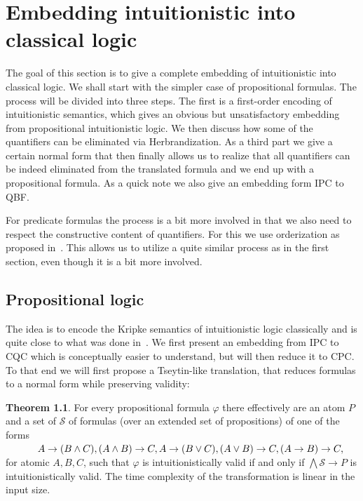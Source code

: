 \documentclass[a4paper,11pt]{report}
\theoremstyle{definition}
\newtheorem{theorem}{Theorem}[section]
\theoremstyle{definition}
\theoremstyle{definition}
\theoremstyle{definition}
\theoremstyle{definition}
\theoremstyle{definition}
\theoremstyle{definition}
\begin{document}
	
	

	\chapter{Embedding intuitionistic into classical logic}\label{chapter:eiicl}
	
	The goal of this section is to give a complete embedding of intuitionistic into classical logic. We shall start with the simpler case of propositional formulas. The process will be divided into three steps. The first is a first-order encoding of intuitionistic semantics, which gives an obvious but unsatisfactory embedding from propositional intuitionistic logic. We then discuss how some of the quantifiers can be eliminated via Herbrandization. As a third part we give a certain normal form that then finally allows us to realize that all quantifiers can be indeed eliminated from the translated formula and we end up with a propositional formula. As a quick note we also give an embedding form IPC to QBF.
	
	For predicate formulas the process is a bit more involved in that we also need to respect the constructive content of quantifiers. For this we use orderization as proposed in~\cite{iemhoff2010eskolemization}. This allows us to utilize a quite similar process as in the first section, even though it is a bit more involved.
	
	\section{Propositional logic}
	
	The idea is to encode the Kripke semantics of intuitionistic logic classically and is quite close to what was done in~\cite{iemhoff2010eskolemization}. We first present an embedding from IPC to CQC which is conceptually easier to understand, but will then reduce it to CPC. To that end we will first propose a Tseytin-like translation, that reduces formulas to a normal form while preserving validity:
	
	\begin{theorem}\label{thm:Tseytin}
		For every propositional formula $\varphi$ there effectively are an atom $P$ and a set of $\mathcal S$ of formulas (over an extended set of propositions) of one of the forms\\
		$\text{ \hspace{1cm}} A\to (B\wedge C), (A\wedge B)\to C, A\to (B\vee C), (A\vee B)\to C, (A\to B)\to C,$\\
		for atomic $A, B, C$, such that $\varphi$ is intuitionistically valid if and only if $\bigwedge\mathcal S\to P$ is intuitionistically valid. The time complexity of the transformation is linear in the input size.
	\end{theorem}
	
\end{document}
